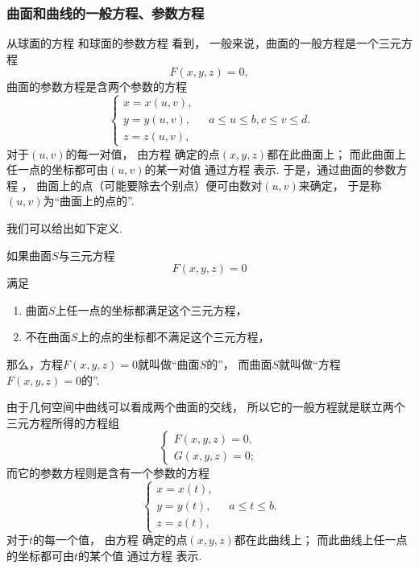 \subsubsection{曲面和曲线的一般方程、参数方程}
从球面的方程 
和球面的参数方程  看到，
一般来说，曲面的一般方程是一个三元方程
\begin{equation}\label{equation:解析几何.曲面的一般方程}
	F(x,y,z) = 0,
\end{equation}
曲面的参数方程是含两个参数的方程
\begin{equation}\label{equation:解析几何.曲面的参数方程}
	\left\{ \begin{array}{l}
		x = x(u,v), \\
		y = y(u,v), \\
		z = z(u,v),
	\end{array} \right.
	\quad
	a \leq u \leq b,
	c \leq v \leq d.
\end{equation}
对于\((u,v)\)的每一对值，
由方程  确定的点\((x,y,z)\)都在此曲面上；
而此曲面上任一点的坐标都可由\((u,v)\)的某一对值
通过方程  表示.
于是，通过曲面的参数方程 ，
曲面上的点（可能要除去个别点）便可由数对\((u,v)\)来确定，
于是称\((u,v)\)为“曲面上的点的”.

我们可以给出如下定义.
\begin{definition}
如果曲面\(S\)与三元方程\[
	F(x,y,z)=0
\]满足
\begin{enumerate}
	\item 曲面\(S\)上任一点的坐标都满足这个三元方程，
	\item 不在曲面\(S\)上的点的坐标都不满足这个三元方程，
\end{enumerate}
那么，方程\(F(x,y,z)=0\)就叫做“曲面\(S\)的”，
而曲面\(S\)就叫做“方程\(F(x,y,z)=0\)的”.
\end{definition}

由于几何空间中曲线可以看成两个曲面的交线，
所以它的一般方程就是联立两个三元方程所得的方程组\begin{equation}\label{equation:解析几何.曲线的一般方程}
	\left\{ \begin{array}{l}
		F(x,y,z) = 0, \\
		G(x,y,z) = 0;
	\end{array} \right.
\end{equation}
而它的参数方程则是含有一个参数的方程
\begin{equation}\label{equation:解析几何.曲线的参数方程}
	\left\{ \begin{array}{l}
		x = x(t), \\
		y = y(t), \\
		z = z(t),
	\end{array} \right.
	\quad
	a \leq t \leq b.
\end{equation}
对于\(t\)的每一个值，
由方程  确定的点\((x,y,z)\)都在此曲线上；
而此曲线上任一点的坐标都可由\(t\)的某个值
通过方程  表示.

